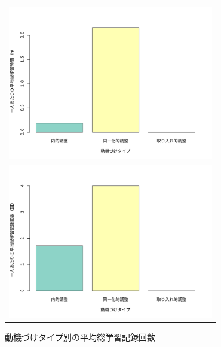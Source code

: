 \begin{figure}[htb]
\begin{center}
\begin{tabular}{c}

\begin{minipage}[htb]{\linewidth}
  \begin{center}
  \includegraphics[width=9cm]{images/7/motivation_type_study_time.pdf}
  \caption{動機づけタイプ別の平均総学習時間}
  \label{fig:motivation_type_study_time}
  \end{center}
\end{minipage}

\\

\begin{minipage}[htb]{\linewidth}
  \begin{center}
  \includegraphics[width=9cm]{images/7/motivation_type_study_count.pdf}
  \caption{動機づけタイプ別の平均総学習記録回数}
  \label{fig:motivation_type_study_count}
  \end{center}
\end{minipage}

\\


\end{tabular}
\end{center}
\end{figure}
